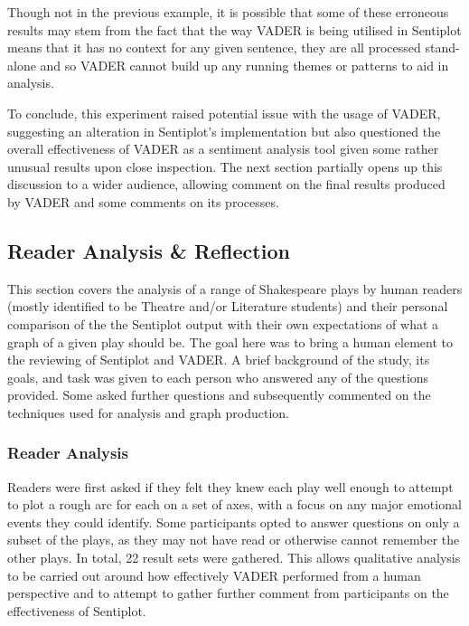 \documentclass{article}
\begin{document}
        Though not in the previous example, it is possible that some of these erroneous results may stem from the fact that the way VADER is being utilised in Sentiplot means that it has no context for any given sentence, they are all processed stand-alone and so VADER cannot build up any running themes or patterns to aid in analysis.

        To conclude, this experiment raised potential issue with the usage of VADER, suggesting an alteration in Sentiplot's implementation but also questioned the overall effectiveness of VADER as a sentiment analysis tool given some rather unusual results upon close inspection. The next section partially opens up this discussion to a wider audience, allowing comment on the final results produced by VADER and some comments on its processes.
    \subsection{Reader Analysis \& Reflection}
    \label{subsec:reader}
        This section covers the analysis of a range of Shakespeare plays by human readers (mostly identified to be Theatre and/or Literature students) and their personal comparison of the the Sentiplot output with their own expectations of what a graph of a given play should be. The goal here was to bring a human element to the reviewing of Sentiplot and VADER. A brief background of the study, its goals, and task was given to each person who answered any of the questions provided. Some asked further questions and subsequently commented on the techniques used for analysis and graph production.
        \subsubsection{Reader Analysis}
            Readers were first asked if they felt they knew each play well enough to attempt to plot a rough arc for each on a set of axes, with a focus on any major emotional events they could identify. Some participants opted to answer questions on only a subset of the plays, as they may not have read or otherwise cannot remember the other plays. In total, 22 result sets were gathered. This allows qualitative analysis to be carried out around how effectively VADER performed from a human perspective and to attempt to gather further comment from participants on the effectiveness of Sentiplot.
\end{document}
